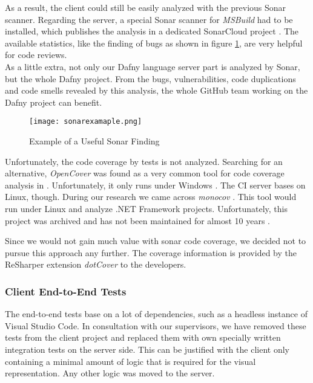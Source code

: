 {As a result, the client could still be easily analyzed with the previous Sonar scanner.
Regarding the server, a special Sonar scanner for \textit{MSBuild} had to be installed, which publishes the analysis in a dedicated SonarCloud project \cite{dev}.
The available statistics, like the finding of bugs as shown in figure \ref{fig:sonarexample}, are very helpful for code reviews.\\

As a little extra, not only our Dafny language server part is analyzed by Sonar,
but the whole Dafny project.
From the bugs, vulnerabilities, code duplications and code smells revealed
by this analysis, the whole GitHub team working on the Dafny project can benefit. \\

\begin{figure}[H]
    \centering
    \texttt{[image: sonarexamaple.png]}
    \caption{Example of a Useful Sonar Finding}
    \label{fig:sonarexample}
\end{figure}

Unfortunately, the code coverage by tests is not analyzed.
Searching for an alternative, \textit{OpenCover} was found as a very common tool for code coverage analysis in \Csharp.
Unfortunately, it only runs under Windows  \cite{opencover}.
The CI server bases on Linux, though.
During our research we came across \textit{monocov} \cite{monocov}.
This tool would run under Linux and analyze .NET Framework projects.
Unfortunately, this project was archived and has not been maintained for almost 10 years \cite{monocov}.

Since we would not gain much value with sonar code coverage, we decided not to pursue this approach any further.
The coverage information is provided by the ReSharper extension \textit{dotCover} \cite{dotcover} to the developers.

\subsubsection{Client End-to-End Tests}
The end-to-end tests base on a lot of dependencies, such as a headless instance of Visual Studio Code.
In consultation with our supervisors, we have removed these tests from the client project and replaced them with own specially written integration tests on the server side.
This can be justified with the client only containing a minimal amount of logic that is required for the visual representation.
Any other logic was moved to the server.

}
